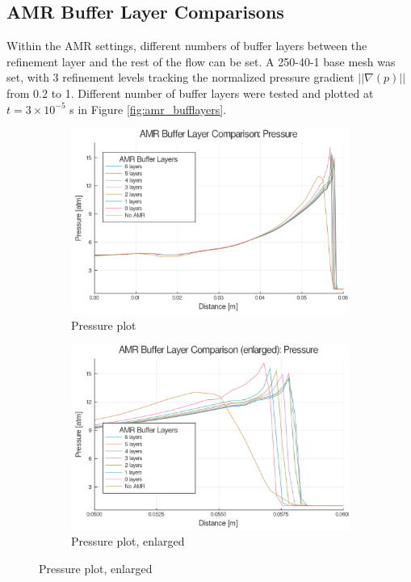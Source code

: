 \subsection{AMR Buffer Layer Comparisons}
Within the AMR settings, different numbers of buffer layers between the refinement layer and the rest of the flow can be set. A 250-40-1 base mesh was set, with 3 refinement levels tracking the normalized pressure gradient \( ||\nabla(p)||\) from 0.2 to 1. Different number of buffer layers were tested and plotted at \(t = 3 \times 10^{ - 5}\) s in Figure \ref{fig:amr_bufflayers}. 
\begin{figure}[]
    \centering
    \begin{subfigure}[]{\textwidth}
        \centering
        \includegraphics[width=\textwidth]{./figs/amrfigs/amr_bufflayers/p.png}
        \caption{Pressure plot}
    \end{subfigure}

    \centering
    \begin{subfigure}[]{\textwidth}
        \centering
        \includegraphics[width=\textwidth]{./figs/amrfigs/amr_bufflayers/pe.png}
        \caption{Pressure plot, enlarged}
    \end{subfigure}

\end{figure}
